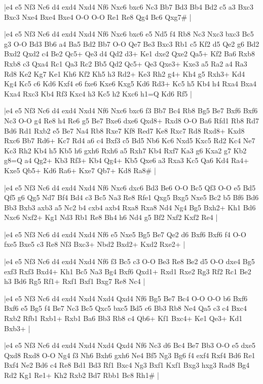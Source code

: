\whitename{}
\blackname{}
\makegametitle
|e4 e5 Nf3 Nc6 d4 exd4 Nxd4 Nf6 Nxc6 bxc6 Nc3 Bb7 Bd3 Bb4 Bd2 c5 a3 Bxc3 Bxc3 Nxe4 Bxe4 Bxe4 O-O O-O Re1 Re8 Qg4 Bc6 Qxg7\#  |

\whitename{}
\blackname{}
\makegametitle
|e4 e5 Nf3 Nc6 d4 exd4 Nxd4 Nf6 Nxc6 bxc6 e5 Nd5 f4 Rb8 Nc3 Nxc3 bxc3 Bc5 g3 O-O Bd3 Bb6 a4 Ba5 Bd2 Bb7 O-O Qe7 Be3 Bxc3 Rb1 c5 Kf2 d5 Qe2 g6 Bd2 Bxd2 Qxd2 c4 Be2 Qc5+ Qe3 d4 Qd2 d3+ Ke1 dxe2 Qxe2 Qa5+ Kf2 Ba6 Rxb8 Rxb8 c3 Qxa4 Rc1 Qa3 Rc2 Bb5 Qd2 Qc5+ Qe3 Qxe3+ Kxe3 a5 Ra2 a4 Ra3 Rd8 Ke2 Kg7 Ke1 Kh6 Kf2 Kh5 h3 Rd2+ Ke3 Rh2 g4+ Kh4 g5 Rxh3+ Kd4 Kg4 Kc5 c6 Kd6 Kxf4 e6 fxe6 Kxe6 Kxg5 Kd6 Rd3+ Kc5 h5 Kb4 h4 Rxa4 Bxa4 Kxa4 Rxc3 Kb4 Rf3 Kxc4 h3 Kc5 h2 Kxc6 h1=Q Kd6 Rf5  |

\whitename{}
\blackname{}
\makegametitle
|e4 e5 Nf3 Nc6 d4 exd4 Nxd4 Nf6 Nxc6 bxc6 f3 Bb7 Bc4 Rb8 Bg5 Be7 Bxf6 Bxf6 Nc3 O-O g4 Re8 h4 Re6 g5 Be7 Bxe6 dxe6 Qxd8+ Rxd8 O-O Ba6 Rfd1 Rb8 Rd7 Bd6 Rd1 Rxb2 e5 Be7 Na4 Rb8 Rxe7 Kf8 Red7 Ke8 Rxc7 Rd8 Rxd8+ Kxd8 Rxc6 Bb7 Rd6+ Kc7 Rd4 a6 c4 Bxf3 c5 Bd5 Nb6 Kc6 Nxd5 Kxc5 Rd2 Kc4 Ne7 Kc3 Rh2 Kb4 h5 Kb5 h6 gxh6 Rxh6 a5 Rxh7 Kb4 Rxf7 Ka3 g6 Kxa2 g7 Kb2 g8=Q a4 Qg2+ Kb3 Rf3+ Kb4 Qg4+ Kb5 Qxe6 a3 Rxa3 Kc5 Qa6 Kd4 Ra4+ Kxe5 Qb5+ Kd6 Ra6+ Kxe7 Qb7+ Kd8 Ra8\#  |

\whitename{}
\blackname{}
\makegametitle
|e4 e5 Nf3 Nc6 d4 exd4 Nxd4 Nf6 Nxc6 dxc6 Bd3 Be6 O-O Bc5 Qf3 O-O e5 Bd5 Qf5 g6 Qg5 Nd7 Bf4 Bd4 c3 Bc5 Na3 Re8 Rfe1 Qxg5 Bxg5 Nxe5 Bc2 b5 Bf6 Bd6 Bb3 Bxb3 axb3 a5 Nc2 b4 cxb4 axb4 Rxa8 Rxa8 Nd4 Ng4 Bg5 Bxh2+ Kh1 Bd6 Nxc6 Nxf2+ Kg1 Nd3 Rb1 Re8 Bh4 h6 Nd4 g5 Bf2 Nxf2 Kxf2 Re4  |

\whitename{}
\blackname{}
\makegametitle
|e4 e5 Nf3 Nc6 d4 exd4 Nxd4 Nf6 e5 Nxe5 Bg5 Be7 Qe2 d6 Bxf6 Bxf6 f4 O-O fxe5 Bxe5 c3 Re8 Nf3 Bxc3+ Nbd2 Bxd2+ Kxd2 Rxe2+  |

\whitename{}
\blackname{}
\makegametitle
|e4 e5 Nf3 Nc6 d4 exd4 Nxd4 Nf6 f3 Bc5 c3 O-O Be3 Re8 Be2 d5 O-O dxe4 Bg5 exf3 Rxf3 Bxd4+ Kh1 Bc5 Na3 Bg4 Bxf6 Qxd1+ Rxd1 Rxe2 Rg3 Rf2 Rc1 Be2 h3 Bd6 Rg5 Rf1+ Rxf1 Bxf1 Bxg7 Re8 Nc4  |

\whitename{}
\blackname{}
\makegametitle
|e4 e5 Nf3 Nc6 d4 exd4 Nxd4 Nxd4 Qxd4 Nf6 Bg5 Be7 Bc4 O-O O-O b6 Bxf6 Bxf6 e5 Bg5 f4 Be7 Nc3 Bc5 Qxc5 bxc5 Bd5 c6 Bb3 Rb8 Ne4 Qa5 c3 c4 Bxc4 Rxb2 Rfb1 Rxb1+ Rxb1 Ba6 Bb3 Rb8 c4 Qb6+ Kf1 Bxc4+ Ke1 Qe3+ Kd1 Bxb3+  |

\whitename{}
\blackname{}
\makegametitle
|e4 e5 Nf3 Nc6 d4 exd4 Nxd4 Nxd4 Qxd4 Nf6 Nc3 d6 Bc4 Be7 Bb3 O-O e5 dxe5 Qxd8 Rxd8 O-O Ng4 f3 Nh6 Bxh6 gxh6 Ne4 Bf5 Ng3 Bg6 f4 exf4 Rxf4 Bd6 Re1 Bxf4 Ne2 Bd6 c4 Re8 Bd1 Bd3 Rf1 Bxc4 Ng3 Bxf1 Kxf1 Bxg3 hxg3 Rad8 Bg4 Rd2 Kg1 Re1+ Kh2 Rxb2 Bd7 Rbb1 Bc8 Rh1\#  |

